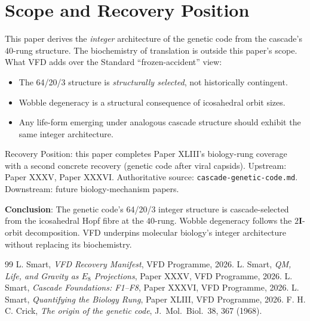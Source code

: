 \documentclass[12pt]{article}
\theoremstyle{remark}
\newcommand{\twoI}{2\mathbf{I}}
\begin{document}
\section{Scope and Recovery Position}\label{sec:scope}

This paper derives the \emph{integer} architecture of the genetic code from the cascade's $40$-rung structure. The biochemistry of translation is outside this paper's scope. What VFD adds over the Standard ``frozen-accident'' view:
\begin{itemize}
\item The 64/20/3 structure is \emph{structurally selected}, not historically contingent.
\item Wobble degeneracy is a structural consequence of icosahedral orbit sizes.
\item Any life-form emerging under analogous cascade structure should exhibit the same integer architecture.
\end{itemize}

Recovery Position: this paper completes Paper XLIII's biology-rung coverage with a second concrete recovery (genetic code after viral capsids). Upstream: Paper XXXV, Paper XXXVI. Authoritative source: \texttt{cascade-genetic-code.md}. Downstream: future biology-mechanism papers.

\textbf{Conclusion}: The genetic code's 64/20/3 integer structure is cascade-selected from the icosahedral Hopf fibre at the $40$-rung. Wobble degeneracy follows the $\twoI$-orbit decomposition. VFD underpins molecular biology's integer architecture without replacing its biochemistry.


\begin{thebibliography}{99}
 L. Smart, \emph{VFD Recovery Manifest}, VFD Programme, 2026.
 L. Smart, \emph{QM, Life, and Gravity as $E_8$ Projections}, Paper XXXV, VFD Programme, 2026.
 L. Smart, \emph{Cascade Foundations: F1--F8}, Paper XXXVI, VFD Programme, 2026.
 L. Smart, \emph{Quantifying the Biology Rung}, Paper XLIII, VFD Programme, 2026.
 F. H. C. Crick, \emph{The origin of the genetic code}, J.\ Mol.\ Biol.\ 38, 367 (1968).
\end{thebibliography}
\end{document}
